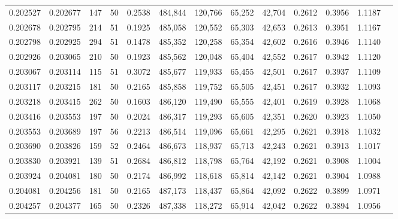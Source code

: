 \begin{tabular}{rrrrrrrrrrrrr}
0.202527 & 0.202677 &   147 &  50 &                                     0.2538 & 484,844 & 120,766 &  65,252 &  42,704 & 0.2612 & 0.3956 & 1.1187 \\
0.202678 & 0.202795 &   214 &  51 &                                     0.1925 & 485,058 & 120,552 &  65,303 &  42,653 & 0.2613 & 0.3951 & 1.1167 \\
0.202798 & 0.202925 &   294 &  51 &                                     0.1478 & 485,352 & 120,258 &  65,354 &  42,602 & 0.2616 & 0.3946 & 1.1140 \\
0.202926 & 0.203065 &   210 &  50 &                                     0.1923 & 485,562 & 120,048 &  65,404 &  42,552 & 0.2617 & 0.3942 & 1.1120 \\
0.203067 & 0.203114 &   115 &  51 &                                     0.3072 & 485,677 & 119,933 &  65,455 &  42,501 & 0.2617 & 0.3937 & 1.1109 \\
0.203117 & 0.203215 &   181 &  50 &                                     0.2165 & 485,858 & 119,752 &  65,505 &  42,451 & 0.2617 & 0.3932 & 1.1093 \\
0.203218 & 0.203415 &   262 &  50 &                                     0.1603 & 486,120 & 119,490 &  65,555 &  42,401 & 0.2619 & 0.3928 & 1.1068 \\
0.203416 & 0.203553 &   197 &  50 &                                     0.2024 & 486,317 & 119,293 &  65,605 &  42,351 & 0.2620 & 0.3923 & 1.1050 \\
0.203553 & 0.203689 &   197 &  56 &                                     0.2213 & 486,514 & 119,096 &  65,661 &  42,295 & 0.2621 & 0.3918 & 1.1032 \\
0.203690 & 0.203826 &   159 &  52 &                                     0.2464 & 486,673 & 118,937 &  65,713 &  42,243 & 0.2621 & 0.3913 & 1.1017 \\
0.203830 & 0.203921 &   139 &  51 &                                     0.2684 & 486,812 & 118,798 &  65,764 &  42,192 & 0.2621 & 0.3908 & 1.1004 \\
0.203924 & 0.204081 &   180 &  50 &                                     0.2174 & 486,992 & 118,618 &  65,814 &  42,142 & 0.2621 & 0.3904 & 1.0988 \\
0.204081 & 0.204256 &   181 &  50 &                                     0.2165 & 487,173 & 118,437 &  65,864 &  42,092 & 0.2622 & 0.3899 & 1.0971 \\
0.204257 & 0.204377 &   165 &  50 &                                     0.2326 & 487,338 & 118,272 &  65,914 &  42,042 & 0.2622 & 0.3894 & 1.0956 \\

\end{tabular}
